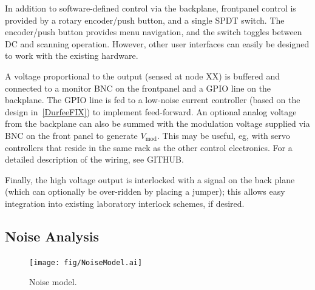 \documentclass[aip,rsi,preprint,graphicx]{revtex4-1} %
\begin{document}
In addition to software-defined control via the backplane, frontpanel control is provided by a rotary encoder/push button, and a single SPDT switch.
The encoder/push button provides menu navigation, and the switch toggles between DC and scanning operation.
However, other user interfaces can easily be designed to work with the existing hardware.

A voltage proportional to the output (sensed at node XX) is buffered and connected to a monitor BNC on the frontpanel and a GPIO line on the backplane.
The GPIO line is fed to a low-noise current controller (based on the design in~\ref{DurfeeFIX}) to implement feed-forward.
An optional analog voltage from the backplane can also be summed with the modulation voltage supplied via BNC on the front panel to generate $V_{\text{mod}}$.
This may be useful, eg, with servo controllers that reside in the same rack as the other control electronics.
For a detailed description of the wiring, see GITHUB.

Finally, the high voltage output is interlocked with a signal on the back plane (which can optionally be over-ridden by placing a jumper); this allows easy integration into existing laboratory interlock schemes, if desired.

\subsection{Noise Analysis}
\label{Sec:NoiseAnalysis}

\begin{figure}[t]
\texttt{[image: fig/NoiseModel.ai]}
\caption{Noise model. \label{Fig:NoiseModel}}
\end{figure}
\end{document}
